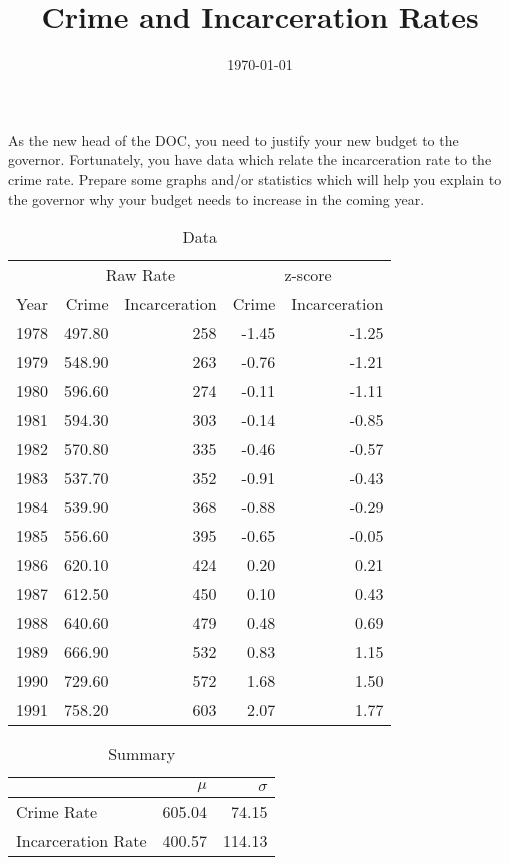 \documentclass{article}
\author{}
\title{Crime and Incarceration Rates}
\date{\today}
\begin{document}
  \maketitle

  As the new head of the DOC, you need to justify your new budget to the
  governor.  Fortunately, you have data which relate the incarceration rate to
  the crime rate.  Prepare some graphs and/or statistics which will help you
  explain to the governor why your budget needs to increase in the coming year.

  \begin{table}[H]
    \centering
    \begin{tabular}{rrrrr}
      \toprule
      & \multicolumn{2}{c}{Raw Rate} & \multicolumn{2}{c}{z-score } \\
      \cmidrule(r){2-3} \cmidrule(r){4-5} 
      Year & Crime  & Incarceration & Crime & Incarceration \\
      \midrule
      1978 & 497.80 & 258           & -1.45 & -1.25 \\
      1979 & 548.90 & 263           & -0.76 & -1.21 \\
      1980 & 596.60 & 274           & -0.11 & -1.11 \\
      1981 & 594.30 & 303           & -0.14 & -0.85 \\
      1982 & 570.80 & 335           & -0.46 & -0.57 \\
      1983 & 537.70 & 352           & -0.91 & -0.43 \\
      1984 & 539.90 & 368           & -0.88 & -0.29 \\
      1985 & 556.60 & 395           & -0.65 & -0.05 \\
      1986 & 620.10 & 424           & 0.20  & 0.21 \\
      1987 & 612.50 & 450           & 0.10  & 0.43 \\
      1988 & 640.60 & 479           & 0.48  & 0.69 \\
      1989 & 666.90 & 532           & 0.83  & 1.15 \\
      1990 & 729.60 & 572           & 1.68  & 1.50 \\
      1991 & 758.20 & 603           & 2.07  & 1.77 \\
      \bottomrule
    \end{tabular}
    \caption{Data}
  \end{table}

  \begin{table}[ht]
    \centering
    \begin{tabular}{lrr}
      \toprule
                         & $\mu$  & $\sigma$ \\
      \midrule
      Crime Rate         & 605.04 & 74.15 \\
      Incarceration Rate & 400.57 & 114.13 \\
      \bottomrule
    \end{tabular}
    \caption{Summary}
  \end{table}
\end{document}
